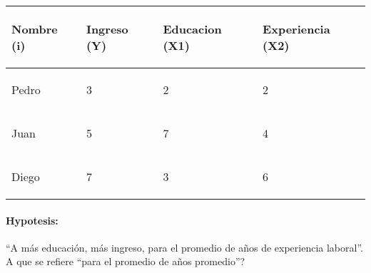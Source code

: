 \documentclass[10pt]{article}
\begin{document}
\begin{table}[!h]
        \centering
        
\begin{tabular}{|p{}|p{}|p{}|p{}|}
\hline 
 \begin{center}
\textbf{Nombre (i)}
\end{center}
 & \begin{center}
\textbf{Ingreso (Y)}
\end{center}
 & \begin{center}
\textbf{Educacion (X1)}
\end{center}
 & \begin{center}
\textbf{Experiencia (X2)}
\end{center}
 \\
\hline 
 \begin{center}
Pedro
\end{center}
 & \begin{center}
3
\end{center}
 & \begin{center}
2
\end{center}
 & \begin{center}
2
\end{center}
 \\
\hline 
 \begin{center}
Juan
\end{center}
 & \begin{center}
5
\end{center}
 & \begin{center}
7
\end{center}
 & \begin{center}
4
\end{center}
 \\
\hline 
 \begin{center}
Diego
\end{center}
 & \begin{center}
7
\end{center}
 & \begin{center}
3
\end{center}
 & \begin{center}
6
\end{center}
 \\
 \hline
\end{tabular}
        
        \end{table}


\paragraph{Hypotesis:} ``A m\'as educaci\'on, m\'as ingreso, para el promedio de a\~nos de experiencia laboral''. {\color{red}A que se refiere ``para el promedio de a\~nos promedio''?}
\end{document}
